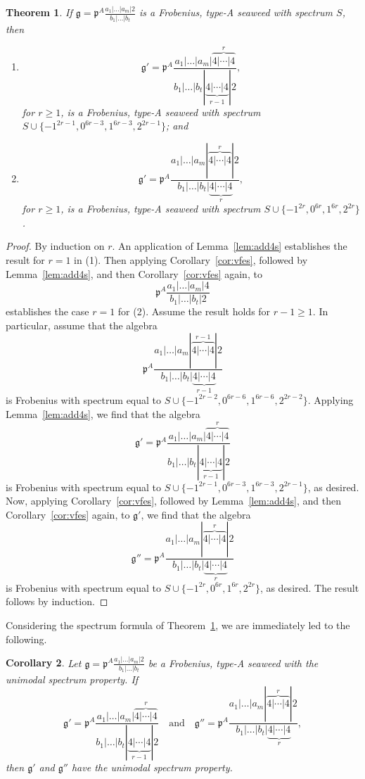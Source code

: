 \documentclass[letterpaper,10pt]{article}
\newtheorem{theorem}{Theorem}
\newtheorem{corollary}[theorem]{Corollary}
\begin{document}
\begin{theorem}\label{thm:addm4s}
If $\mathfrak{g}=\mathfrak{p}^A\frac{a_1|\hdots|a_m|2}{b_1|\hdots|b_t}$ is a Frobenius, type-A seaweed with spectrum $S$, then
\begin{enumerate}
    \item[\textup{(1)}] $$\mathfrak{g}'=\mathfrak{p}^A\frac{a_1|\hdots|a_m|\overbrace{4|\cdots|4}^r}{b_1|\hdots|b_t|\underbrace{4|\cdots|4}_{r-1}|2},$$ for $r\ge 1$, is a Frobenius, type-A seaweed with spectrum $S\cup\{-1^{2r-1},0^{6r-3},1^{6r-3},2^{2r-1}\}$; and
    \item[\textup{(2)}] $$\mathfrak{g}'=\mathfrak{p}^A\frac{a_1|\hdots|a_m|\overbrace{4|\cdots|4}^r|2}{b_1|\hdots|b_t|\underbrace{4|\cdots|4}_{r}},$$ for $r\ge 1$, is a Frobenius, type-A seaweed with spectrum $S\cup\{-1^{2r},0^{6r},1^{6r},2^{2r}\}$.
\end{enumerate}
\end{theorem}
\begin{proof}
By induction on $r$. An application of Lemma~\ref{lem:add4s} establishes the result for $r=1$ in (1). Then applying Corollary~\ref{cor:vfes}, followed by Lemma~\ref{lem:add4s}, and then Corollary~\ref{cor:vfes} again, to $$\mathfrak{p}^A\frac{a_1|\hdots|a_m|4}{b_1|\hdots|b_t|2}$$ establishes the case $r=1$ for (2). Assume the result holds for $r-1\ge 1$. In particular, assume that the algebra $$\mathfrak{p}^A\frac{a_1|\hdots|a_m|\overbrace{4|\cdots|4}^{r-1}|2}{b_1|\hdots|b_t|\underbrace{4|\cdots|4}_{r-1}}$$ is Frobenius with spectrum equal to $S\cup \{-1^{2r-2},0^{6r-6},1^{6r-6},2^{2r-2}\}$. Applying Lemma~\ref{lem:add4s}, we find that the algebra $$\mathfrak{g}'=\mathfrak{p}^A\frac{a_1|\hdots|a_m|\overbrace{4|\cdots|4}^r}{b_1|\hdots|b_t|\underbrace{4|\cdots|4}_{r-1}|2}$$ is Frobenius with spectrum equal to $S\cup \{-1^{2r-1},0^{6r-3},1^{6r-3},2^{2r-1}\}$, as desired. Now, applying Corollary~\ref{cor:vfes}, followed by Lemma~\ref{lem:add4s}, and then Corollary~\ref{cor:vfes} again, to $\mathfrak{g}'$, we find that the algebra $$\mathfrak{g}''=\mathfrak{p}^A\frac{a_1|\hdots|a_m|\overbrace{4|\cdots|4}^r|2}{b_1|\hdots|b_t|\underbrace{4|\cdots|4}_{r}}$$ is Frobenius with spectrum equal to $S\cup\{-1^{2r},0^{6r},1^{6r},2^{2r}\}$, as desired. The result follows by induction.
\end{proof}

Considering the spectrum formula of Theorem~\ref{thm:addm4s}, we are immediately led to the following.

\begin{corollary}\label{cor:444}
Let $\mathfrak{g}=\mathfrak{p}^A\frac{a_1|\hdots|a_m|2}{b_1|\hdots|b_t}$ be a Frobenius, type-A seaweed with the unimodal spectrum property. If
$$\mathfrak{g}'=\mathfrak{p}^A\frac{a_1|\hdots|a_m|\overbrace{4|\cdots|4}^r}{b_1|\hdots|b_t|\underbrace{4|\cdots|4}_{r-1}|2}\quad\text{and}\quad \mathfrak{g}''=\mathfrak{p}^A\frac{a_1|\hdots|a_m|\overbrace{4|\cdots|4}^r|2}{b_1|\hdots|b_t|\underbrace{4|\cdots|4}_{r}},$$ then $\mathfrak{g}'$ and $\mathfrak{g}''$ have the unimodal spectrum property.
\end{corollary}
\end{document}
